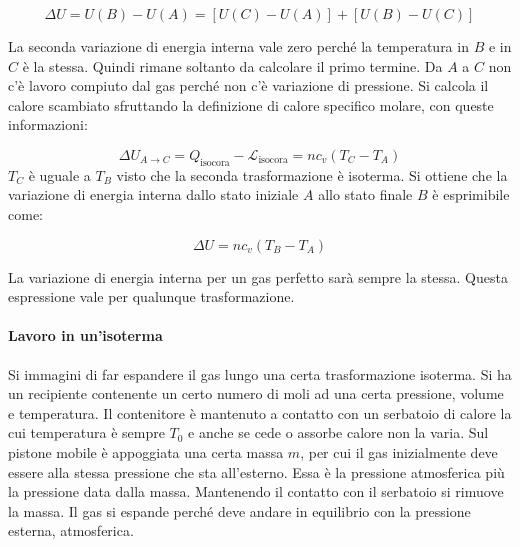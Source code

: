 \[
	\Delta U = U(B)-U(A) = [U(C)-U(A)] + [U(B)-U(C)]
\]

La seconda variazione di energia interna vale zero perché la temperatura in $B$ e in $C$ è la stessa. Quindi rimane soltanto da calcolare il primo termine. Da $A$ a $C$ non c'è lavoro compiuto dal gas perché non c'è variazione di pressione. Si calcola il calore scambiato sfruttando la definizione di calore specifico molare, con queste informazioni:

\[
	\Delta U_{A\to C} = Q_{\text{isocora} } - \mathcal{L}_{\text{isocora} } = nc_v(T_C-T_A  )
\]
$T_C$ è uguale a $T_B$ visto che la seconda trasformazione è isoterma. Si ottiene che la variazione di energia interna dallo stato iniziale $A$ allo stato finale $B$ è esprimibile come:

\[
	\Delta U = nc_v(T_B-T_A  )
\]

La variazione di energia interna per un gas perfetto sarà sempre la stessa. Questa espressione vale per qualunque trasformazione.

\paragraph{Lavoro in un'isoterma} Si immagini di far espandere il gas lungo una certa trasformazione isoterma. Si ha un recipiente contenente un certo numero di moli ad una certa pressione, volume e temperatura. Il contenitore è mantenuto a contatto con un serbatoio di calore la cui temperatura è sempre $T_0$ e anche se cede o assorbe calore non la varia. Sul pistone mobile è appoggiata una certa massa $m$, per cui il gas inizialmente deve essere alla stessa pressione che sta all'esterno. Essa è la pressione atmosferica più la pressione data dalla massa. Mantenendo il contatto con il serbatoio si rimuove la massa. Il gas si espande perché deve andare in equilibrio con la pressione esterna,  atmosferica.

